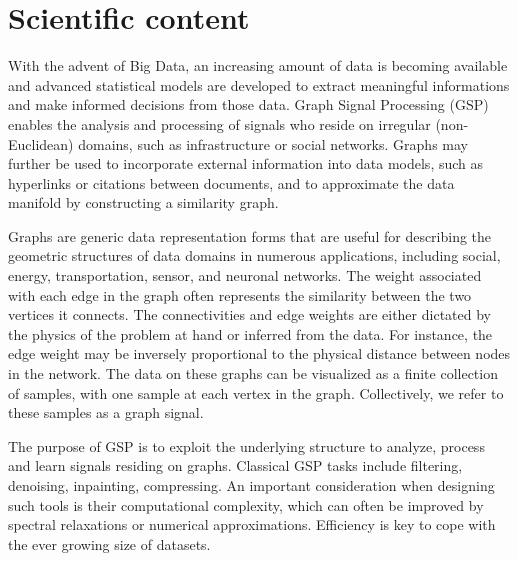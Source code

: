\documentclass[a4paper]{scrartcl}
\begin{document}
\section{Scientific content}

With the advent of Big Data, an increasing amount of data is becoming available
and advanced statistical models are developed to extract meaningful informations
and make informed decisions from those data. Graph Signal Processing (GSP)
enables the analysis and processing of signals who reside on irregular
(non-Euclidean) domains, such as infrastructure or social networks. Graphs may
further be used to incorporate external information into data models, such as
hyperlinks or citations between documents, and to approximate the data manifold
by constructing a similarity graph.

Graphs are generic data representation forms that are useful for describing the
geometric structures of data domains in numerous applications, including social,
energy, transportation, sensor, and neuronal networks.
The weight associated with each edge in the graph often represents the
similarity between the two vertices it connects. The connectivities and edge
weights are either dictated by the physics of the problem at hand or inferred
from the data. For instance, the edge weight may be inversely proportional to
the physical distance between nodes in the network.
The data on these graphs can be visualized as a finite collection of samples,
with one sample at each vertex in the graph. Collectively, we refer to these
samples as a graph signal. 

The purpose of GSP is to exploit the underlying structure to analyze, process
and learn signals residing on graphs. 
Classical GSP tasks
include filtering, denoising, inpainting, compressing. An important
consideration when designing such tools is their computational complexity, which
can often be improved by spectral relaxations or numerical approximations.
Efficiency is key to cope with the ever growing size of datasets.
\end{document}
